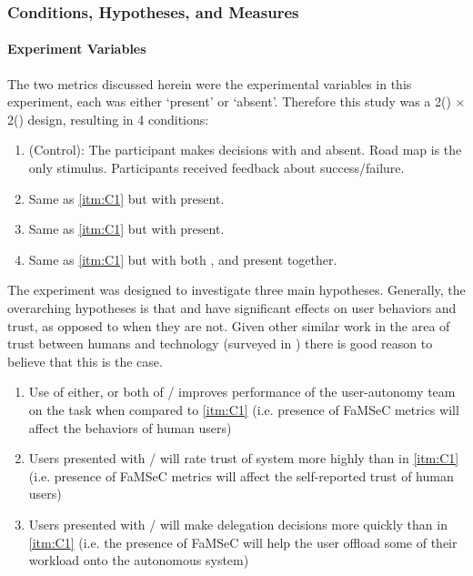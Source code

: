     \subsubsection{Conditions, Hypotheses, and Measures} \label{sec:hyp_cond_meas}
    \paragraph{Experiment Variables}
    The two \famsec{} metrics discussed herein were the experimental variables in this experiment, each was either `present' or `absent'. Therefore this study was a 2(\xQ) $\times$ 2(\xO) design, resulting in 4 conditions:

    \begin{enumerate}[label=\textbf{C\arabic*}]
        \item (Control): The participant makes decisions with \xQ{} and \xO{} absent. Road map is the only stimulus. Participants received feedback about success/failure. \label{itm:C1}
        \item Same as \ref{itm:C1} but with \xQ{} present.\label{itm:C2}
        \item Same as \ref{itm:C1} but with \xO{} present. \label{itm:C3}
        \item Same as \ref{itm:C1} but with both \xQ{}, and \xO{} present together. \label{itm:C4}
    \end{enumerate}

    The experiment was designed to investigate three main hypotheses. Generally, the overarching hypotheses is that \xQ{} and \xO{} have significant effects on user behaviors and trust, as opposed to when they are not. Given other similar work in the area of trust between humans and technology (surveyed in \cite{Israelsen2019-to}) there is good reason to believe that this is the case.

    \begin{enumerate}[label=\textbf{H\arabic*}]
        \item Use of either, or both  of \xQ{}/\xO{} improves performance of the user-autonomy team on the task when compared to \ref{itm:C1} (i.e. presence of FaMSeC metrics will affect the behaviors of human users) \label{itm:H1}
        \item Users presented with \xQ{}/\xO{} will rate trust of system more highly than in \ref{itm:C1} (i.e. presence of FaMSeC metrics will affect the self-reported trust of human users) \label{itm:H2}
        \item Users presented with \xQ{}/\xO{} will make delegation decisions more quickly than in \ref{itm:C1} (i.e. the presence of FaMSeC will help the user offload some of their workload onto the autonomous system) \label{itm:H3}
    \end{enumerate}

